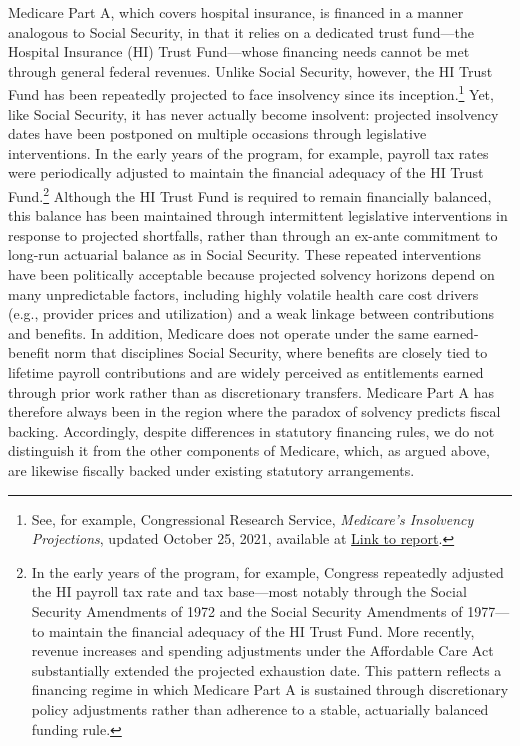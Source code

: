 \documentclass[12pt]{article}%
\theoremstyle{remark}
\begin{document}
Medicare Part A, which covers hospital insurance, is financed in a manner analogous to Social Security, in that it relies on a dedicated trust fund—the Hospital Insurance (HI) Trust Fund—whose financing needs cannot be met through general federal revenues. Unlike Social Security, however, the HI Trust Fund has been repeatedly projected to face insolvency since its inception.\footnote{See, for example, Congressional Research Service, \emph{Medicare’s Insolvency Projections}, updated October 25, 2021, available at \href{https://www.congress.gov/crs_external_products/RS/HTML/RS20946.web.html}{Link to report}.} Yet, like Social Security, it has never actually become insolvent: projected insolvency dates have been postponed on multiple occasions through legislative interventions. In the early years of the program, for example, payroll tax rates were periodically adjusted to maintain the financial adequacy of the HI Trust Fund.\footnote{In the early years of the program, for example, Congress repeatedly adjusted the HI payroll tax rate and tax base—most notably through the Social Security Amendments of 1972 and the Social Security Amendments of 1977---to maintain the financial adequacy of the HI Trust Fund. More recently, revenue increases and spending adjustments under the Affordable Care Act substantially extended the projected exhaustion date. This pattern reflects a financing regime in which Medicare Part A is sustained through discretionary policy adjustments rather than adherence to a stable, actuarially balanced funding rule.} 
Although the HI Trust Fund is required to remain financially balanced, this balance has been maintained through intermittent legislative interventions in response to projected shortfalls, rather than through an ex-ante commitment to long-run actuarial balance as in Social Security. These repeated interventions have been politically acceptable because projected solvency horizons depend on many unpredictable factors, including highly volatile health care cost drivers (e.g., provider prices and utilization) and a weak linkage between contributions and benefits. In addition, Medicare does not operate under the same earned-benefit norm that disciplines Social Security, where benefits are closely tied to lifetime payroll contributions and are widely perceived as entitlements earned through prior work rather than as discretionary transfers.
Medicare Part A has therefore always been in the region where the paradox of solvency predicts fiscal backing. Accordingly, despite differences in statutory financing rules, we do not distinguish it from the other components of Medicare, which, as argued above, are likewise fiscally backed under existing statutory arrangements.
\end{document}
